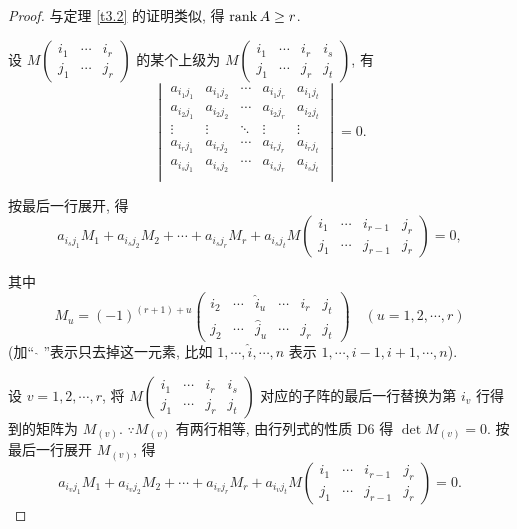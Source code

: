 \documentclass[color=black,device=normal,lang=cn,mode=geye]{elegantnote}
\begin{document}
\begin{proof}
    与定理 \ref{t3.2} 的证明类似, 得 $\operatorname{rank} A\geq r$.

    设 $M\begin{pmatrix} i_1 & \cdots & i_r \\ j_1 & \cdots & j_r \end{pmatrix}$ 的某个上级为 $M\begin{pmatrix} i_1 & \cdots & i_r & i_s \\ j_1 & \cdots & j_r & j_t \end{pmatrix}$, 有
    \[\begin{vmatrix}
        a_{i_1j_1} & a_{i_1j_2} & \cdots & a_{i_1j_r} & a_{i_1j_t} \\
        a_{i_2j_1} & a_{i_2j_2} & \cdots & a_{i_2j_r} & a_{i_2j_t} \\
        \vdots & \vdots & \ddots & \vdots & \vdots \\
        a_{i_rj_1} & a_{i_rj_2} & \cdots & a_{i_rj_r} & a_{i_rj_t} \\
        a_{i_sj_1} & a_{i_sj_2} & \cdots & a_{i_sj_r} & a_{i_sj_t} \\
    \end{vmatrix}=0.\]

    按最后一行展开, 得
    \begin{equation}\label{eq3.1}
        a_{i_sj_1}M_1+a_{i_sj_2}M_2+\cdots+a_{i_sj_r}M_r+a_{i_sj_t}M\begin{pmatrix}
            i_1 & \cdots & i_{r-1} & j_r \\
            j_1 & \cdots & j_{r-1} & j_r
        \end{pmatrix}=0,
    \end{equation}

    其中
    \[M_u=(-1)^{(r+1)+u}\begin{pmatrix}
        i_2 & \cdots & \hat{i}_u & \cdots & i_r & j_t \\
        j_2 & \cdots & \hat{j}_u & \cdots & j_r & j_t
    \end{pmatrix}\quad(u=1,2,\cdots,r)\]
    (加`` $\hat{}$ ''表示只去掉这一元素, 比如 $1,\cdots,\hat{i},\cdots,n$ 表示 $1,\cdots,i-1,i+1,\cdots,n$).
    
    设 $v=1,2,\cdots,r$, 将 $M\begin{pmatrix} i_1 & \cdots & i_r & i_s \\ j_1 & \cdots & j_r & j_t \end{pmatrix}$ 对应的子阵的最后一行替换为第 $i_v$ 行得到的矩阵为 $M_{(v)}$. $\because M_{(v)}$ 有两行相等, 由行列式的性质 D6 得 $\det M_{(v)}=0$. 按最后一行展开 $M_{(v)}$, 得
    \[a_{i_vj_1}M_1+a_{i_vj_2}M_2+\cdots+a_{i_vj_r}M_r+a_{i_vj_t}M\begin{pmatrix}
        i_1 & \cdots & i_{r-1} & j_r \\
        j_1 & \cdots & j_{r-1} & j_r
    \end{pmatrix}=0.\]


\end{proof}
\end{document}
